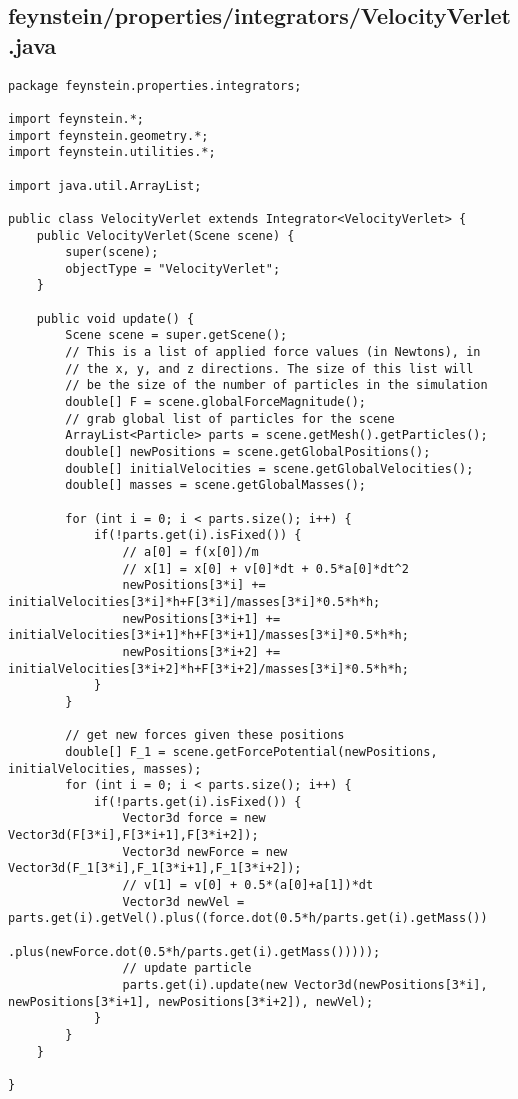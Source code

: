\subsection*{feynstein/properties/integrators/VelocityVerlet.java}
\begin{lstlisting}
package feynstein.properties.integrators;

import feynstein.*;
import feynstein.geometry.*;
import feynstein.utilities.*;

import java.util.ArrayList;

public class VelocityVerlet extends Integrator<VelocityVerlet> {
    public VelocityVerlet(Scene scene) {
		super(scene);
		objectType = "VelocityVerlet";
    }
	
    public void update() {
		Scene scene = super.getScene();
		// This is a list of applied force values (in Newtons), in 
		// the x, y, and z directions. The size of this list will
		// be the size of the number of particles in the simulation
		double[] F = scene.globalForceMagnitude();
		// grab global list of particles for the scene
		ArrayList<Particle> parts = scene.getMesh().getParticles();
		double[] newPositions = scene.getGlobalPositions();
		double[] initialVelocities = scene.getGlobalVelocities();
		double[] masses = scene.getGlobalMasses();
		
		for (int i = 0; i < parts.size(); i++) {
			if(!parts.get(i).isFixed()) {
				// a[0] = f(x[0])/m
				// x[1] = x[0] + v[0]*dt + 0.5*a[0]*dt^2
				newPositions[3*i] += initialVelocities[3*i]*h+F[3*i]/masses[3*i]*0.5*h*h;
				newPositions[3*i+1] += initialVelocities[3*i+1]*h+F[3*i+1]/masses[3*i]*0.5*h*h;
				newPositions[3*i+2] += initialVelocities[3*i+2]*h+F[3*i+2]/masses[3*i]*0.5*h*h;
			}
		}
		
		// get new forces given these positions
		double[] F_1 = scene.getForcePotential(newPositions, initialVelocities, masses);
		for (int i = 0; i < parts.size(); i++) {
			if(!parts.get(i).isFixed()) {
				Vector3d force = new Vector3d(F[3*i],F[3*i+1],F[3*i+2]);
				Vector3d newForce = new Vector3d(F_1[3*i],F_1[3*i+1],F_1[3*i+2]);
				// v[1] = v[0] + 0.5*(a[0]+a[1])*dt
				Vector3d newVel = parts.get(i).getVel().plus((force.dot(0.5*h/parts.get(i).getMass())
															  .plus(newForce.dot(0.5*h/parts.get(i).getMass()))));
				// update particle
				parts.get(i).update(new Vector3d(newPositions[3*i], newPositions[3*i+1], newPositions[3*i+2]), newVel);
			}
		}
    }

}\end{lstlisting}

